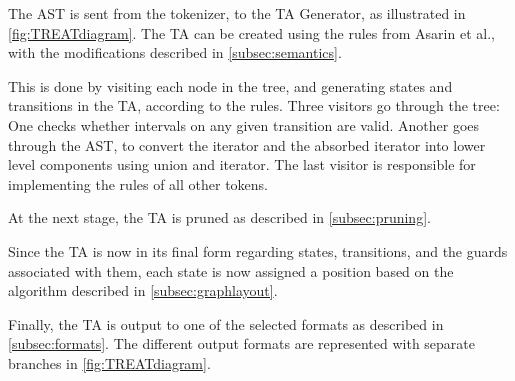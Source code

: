 \vspace{.5\baselineskip plus 2pt}
The AST is sent from the tokenizer, to the TA Generator, as illustrated in \cref{fig:TREATdiagram}. The TA can be created using the rules from Asarin et al., with the modifications described in \cref{subsec:semantics}.

\vspace{.5\baselineskip plus 2pt}
This is done by visiting each node in the tree, and generating states and transitions in the TA, according to the rules. Three visitors go through the tree: One checks whether intervals on any given transition are valid. Another goes through the AST, to convert the iterator and the absorbed iterator into lower level components using union and iterator. The last visitor is responsible for implementing the rules of all other tokens.

\vspace{.5\baselineskip plus 2pt}
At the next stage, the TA is pruned as described in \cref{subsec:pruning}.

\vspace{.5\baselineskip plus 2pt}
Since the TA is now in its final form regarding states, transitions, and the guards associated with them, each state is now assigned a position based on the algorithm described in \cref{subsec:graphlayout}.

\vspace{.5\baselineskip plus 2pt}
Finally, the TA is output to one of the selected formats as described in \cref{subsec:formats}. The different output formats are represented with separate branches in \cref{fig:TREATdiagram}.
